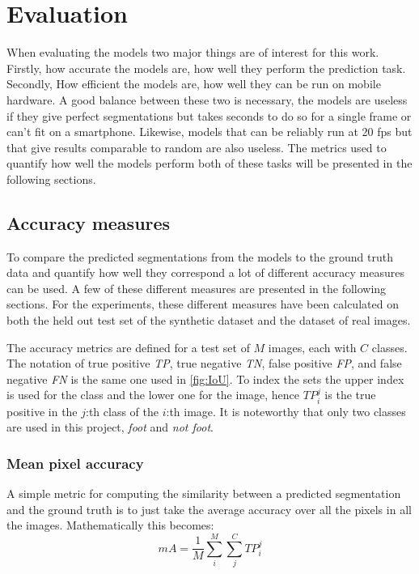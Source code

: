 \documentclass{kththesis}
\begin{document}
\section{Evaluation}
When evaluating the models two major things are of interest for this work.
Firstly, how accurate the models are, how well they perform the prediction task.
Secondly, How efficient the models are, how well they can be run on mobile
hardware. A good balance between these two is necessary, the models are useless
if they give perfect segmentations but takes seconds to do so for a single frame
or can't fit on a smartphone. Likewise, models that can be reliably run at 20
fps but that give results comparable to random are also useless. The metrics
used to quantify how well the models perform both of these tasks will be
presented in the following sections.

\subsection{Accuracy measures} \label{sec:accuracy}
To compare the predicted segmentations from the models to the ground truth data
and quantify how well they correspond a lot of different accuracy measures can
be used. A few of these different measures are presented in the following
sections. For the experiments, these different measures have been calculated on
both the held out test set of the synthetic dataset and the dataset of real
images.

The accuracy metrics are defined for a test set of \(M\) images, each with \(C\)
classes. The notation of true positive \textit{TP}, true negative \textit{TN},
false positive \textit{FP}, and false negative \textit{FN} is the same one used
in \cref{fig:IoU}. To index the sets the upper index is used for the class and
the lower one for the image, hence \(\textit{TP}^j_i\) is the true positive in
the \(j\):th class of the \(i\):th image. It is noteworthy that only two
classes are used in this project, \textit{foot} and \textit{not foot}.
 
\subsubsection{Mean pixel accuracy}
A simple metric for computing the similarity between a predicted
segmentation and the ground truth is to just take the average accuracy over all
the pixels in all the images. Mathematically this becomes:
\[\textit{mA} = \frac{1}{M}\sum^M_i\sum^C_j\textit{TP}_i^j\]
\end{document}
